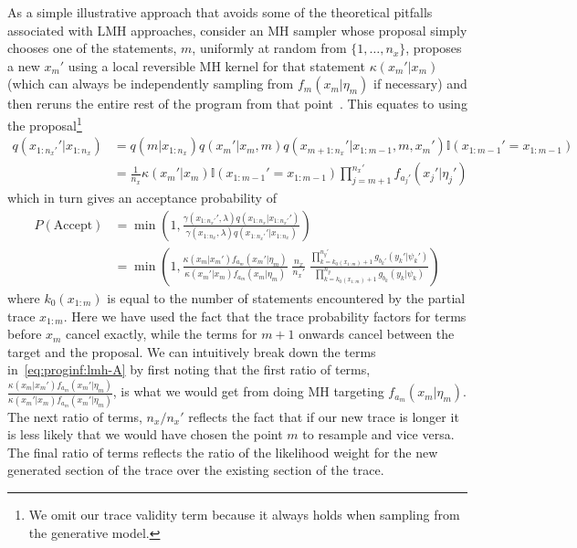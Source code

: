 As a simple illustrative approach that avoids some of the theoretical pitfalls associated
with LMH approaches, consider an MH sampler whose proposal simply chooses one
of the \sample statements, $m$, uniformly at random from $\{1,\dots,n_x\}$, proposes
 a new $x_m'$ using a local reversible
MH kernel for that \sample statement $\kappa(x_m' | x_{m})$ (which can always be independently sampling
from $f_m(x_m|\eta_m)$ if necessary) and then reruns the entire rest of the program
from that point~\citep{wood2014new}.  This equates to using the 
proposal\footnote{We omit our trace validity term because it always holds when sampling from the generative model.}
\begin{align}
q(x_{1:n_x'}' | x_{1:n_x}) &= q(m|x_{1:n_x}) q(x_m' | x_{m}, m) q(x_{m+1:n_x}' | x_{1:m-1}, m, x_m') \mathbb{I}(x_{1:m-1}'=x_{1:m-1}) \nonumber \\
&=\frac{1}{n_x} \kappa(x_m' | x_{m}) \mathbb{I}(x_{1:m-1}'=x_{1:m-1})  \prod_{j=m+1}^{n_x'} f_{a_{j}'} (x_{j}' | \eta_{j}')
\end{align}
which in turn gives an acceptance probability of
\begin{align}
P(\text{Accept}) &= \min\left(1, \frac{\gamma(x_{1:n_x'}',\lambda) q(x_{1:n_x} | x_{1:n_x'}') }
{\gamma(x_{1:n_x},\lambda) q(x_{1:n_x'}' | x_{1:n_x}) }\right) \nonumber\\
&= \min\left(1, \frac{\kappa(x_m | x_{m}') f_{a_m} (x_m' | \eta_m)} {\kappa(x_m' | x_{m}) f_{a_m} (x_m | \eta_m)} \;
\frac{n_x}{n_x'} \; \frac{\prod_{k=k_0(x_{1:m})+1}^{n_y'} g_{b_{k}'} (y_{k}' | \psi_{k}')}
{\prod_{k=k_0(x_{1:m})+1}^{n_y} g_{b_{k}} (y_{k} | \psi_{k}) }\right) \label{eq:proginf:lmh-A}
\end{align}
where $k_0(x_{1:m})$ is equal to the number of \observe statements encountered by the partial
trace $x_{1:m}$.  Here we have used the fact that the trace probability factors for terms 
before $x_m$ cancel
exactly, while the \sample terms for $m+1$ onwards cancel between the target and the proposal.
We can intuitively break down the terms in~\eqref{eq:proginf:lmh-A} by first noting that the first
ratio of terms, $\frac{\kappa(x_m | x_{m}') f_{a_m} (x_m' | \eta_m)} {\kappa(x_m' | x_{m}) f_{a_m} (x_m' | \eta_m)}$, is what we would get from
doing MH targeting $f_{a_m}(x_m|\eta_m)$.  The next ratio of terms,
$n_x / n_x'$ reflects the fact that if our new trace is longer it is less likely that we would have chosen the
point $m$ to resample and vice versa.  The final ratio of terms reflects the ratio of the likelihood weight
for the new generated section of the trace over the existing section of the trace.

